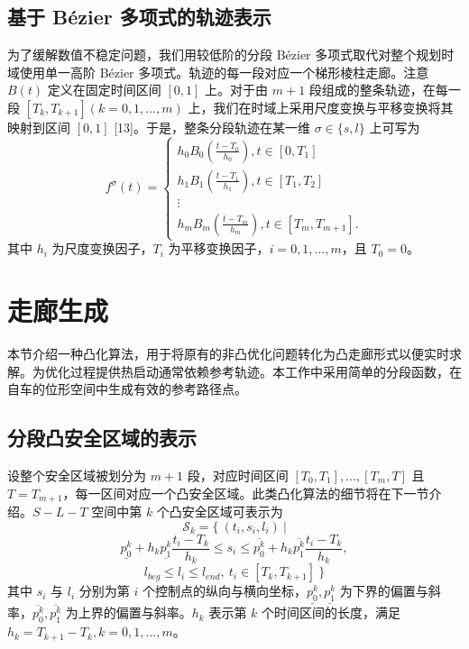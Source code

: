 \documentclass[UTF8,a4paper,12pt,fontset=none]{ctexart}
\theoremstyle{definition}
\theoremstyle{plain}
\theoremstyle{plain}
\theoremstyle{plain}
\begin{document}
\subsection{基于 B\'{e}zier 多项式的轨迹表示}
为了缓解数值不稳定问题，我们用较低阶的分段 B\'{e}zier 多项式取代对整个规划时域使用单一高阶 B\'{e}zier 多项式。轨迹的每一段对应一个梯形棱柱走廊。注意 $B(t)$ 定义在固定时间区间 $[0,1]$ 上。对于由 $m+1$ 段组成的整条轨迹，在每一段 $\left[T_{k}, T_{k+1}\right] (k = 0,1,\ldots,m)$ 上，我们在时域上采用尺度变换与平移变换将其映射到区间 $[0,1]$ [13]。于是，整条分段轨迹在某一维 $\sigma\in\{s,l\}$ 上可写为
$$
f^{\sigma}(t)=\left\{\begin{array}{c}
h_{0} B_{0}\left(\frac{t-T_{0}}{h_{0}}\right), t \in\left[0, T_{1}\right] \\
h_{1} B_{1}\left(\frac{t-T_{1}}{h_{1}}\right), t \in\left[T_{1}, T_{2}\right] \\
\vdots \\
h_{m} B_{m}\left(\frac{t-T_{m}}{h_{m}}\right), t \in\left[T_{m}, T_{m+1}\right] .
\end{array}\right.
$$
其中 $h_i$ 为尺度变换因子，$T_i$ 为平移变换因子，$i = 0,1,\ldots,m$，且 $T_0 = 0$。


\section{走廊生成}

本节介绍一种凸化算法，用于将原有的非凸优化问题转化为凸走廊形式以便实时求解。为优化过程提供热启动通常依赖参考轨迹。本工作中采用简单的分段函数，在自车的位形空间中生成有效的参考路径点。

\subsection{分段凸安全区域的表示}

设整个安全区域被划分为 $m+1$ 段，对应时间区间 $\left[T_{0}, T_{1}\right], \ldots,\left[T_{m}, T\right]$ 且 $T =T_{m+1}$，每一区间对应一个凸安全区域。此类凸化算法的细节将在下一节介绍。$S-L-T$ 空间中第 $k$ 个凸安全区域可表示为
$$\mathcal{S}_{k} = \{\ (t_i, s_i, l_i)\ | $$
$$\underline{p^{k}_0} + h_k \underline{p^{k}_1} \frac{t_i - T_k}{h_k} \leq s_i \leq \overline{p^{k}_0} + h_k \overline{p^{k}_1} \frac{t_i - T_k}{h_k},$$
$$l_{beg} \leq l_i \leq l_{end},\ t_i \in [T_k, T_{k+1}]\ \}$$
其中 $s_i$ 与 $l_i$ 分别为第 $i$ 个控制点的纵向与横向坐标，$\underline{p_{0}^{k}}, \underline{p_{1}^{k}}$ 为下界的偏置与斜率，$\overline{p_{0}^{k}}, \overline{p_{1}^{k}}$ 为上界的偏置与斜率。$h_{k}$ 表示第 $k$ 个时间区间的长度，满足 $h_{k}=T_{k+1}-T_{k}, k=0,1, \ldots, m$。
\end{document}
